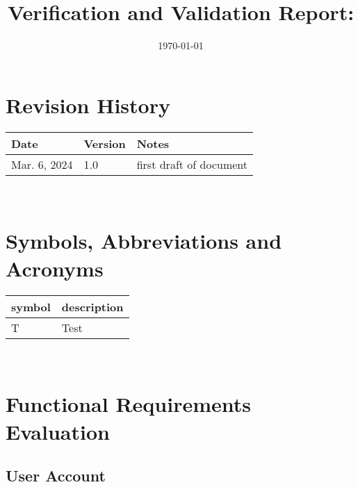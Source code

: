 \documentclass[12pt, titlepage]{article}
\begin{document}
\title{Verification and Validation Report: \progname} 
\author{\authname}
\date{\today}
	
\maketitle


\section{Revision History}

\begin{tabularx}{\textwidth}{p{3cm}p{2cm}X}
\toprule {\bf Date} & {\bf Version} & {\bf Notes}\\
\midrule
Mar. 6, 2024 & 1.0 & first draft of document\\
\bottomrule
\end{tabularx}

~\newpage

\section{Symbols, Abbreviations and Acronyms}

\renewcommand{\arraystretch}{1.2}
\begin{tabular}{l l} 
  \toprule		
  \textbf{symbol} & \textbf{description}\\
  \midrule 
  T & Test\\
  \bottomrule
\end{tabular}\\


\newpage

\tableofcontents

\listoftables %

\listoffigures %

\newpage


\section{Functional Requirements Evaluation}
\subsection{User Account}
\end{document}

